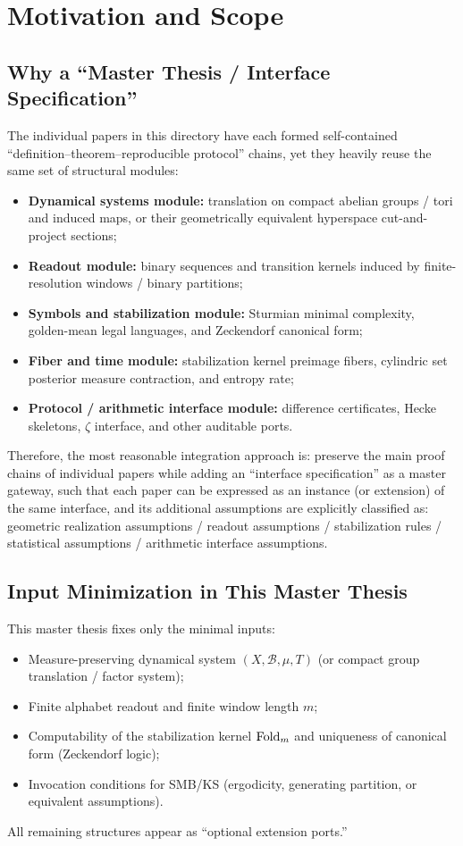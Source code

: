 \section{Motivation and Scope}

\subsection{Why a ``Master Thesis / Interface Specification''}

The individual papers in this directory have each formed self-contained ``definition--theorem--reproducible protocol'' chains, yet they heavily reuse the same set of structural modules:
\begin{itemize}
  \item \textbf{Dynamical systems module:} translation on compact abelian groups / tori and induced maps, or their geometrically equivalent hyperspace cut-and-project sections;
  \item \textbf{Readout module:} binary sequences and transition kernels induced by finite-resolution windows / binary partitions;
  \item \textbf{Symbols and stabilization module:} Sturmian minimal complexity, golden-mean legal languages, and Zeckendorf canonical form;
  \item \textbf{Fiber and time module:} stabilization kernel preimage fibers, cylindric set posterior measure contraction, and entropy rate;
  \item \textbf{Protocol / arithmetic interface module:} difference certificates, Hecke skeletons, $\zeta$ interface, and other auditable ports.
\end{itemize}

Therefore, the most reasonable integration approach is: preserve the main proof chains of individual papers while adding an ``interface specification'' as a master gateway, such that each paper can be expressed as an instance (or extension) of the same interface, and its additional assumptions are explicitly classified as: geometric realization assumptions / readout assumptions / stabilization rules / statistical assumptions / arithmetic interface assumptions.

\subsection{Input Minimization in This Master Thesis}

This master thesis fixes only the minimal inputs:
\begin{itemize}
  \item Measure-preserving dynamical system $(X,\mathcal{B},\mu,T)$ (or compact group translation / factor system);
  \item Finite alphabet readout and finite window length $m$;
  \item Computability of the stabilization kernel $\mathrm{Fold}_m$ and uniqueness of canonical form (Zeckendorf logic);
  \item Invocation conditions for SMB/KS (ergodicity, generating partition, or equivalent assumptions).
\end{itemize}
All remaining structures appear as ``optional extension ports.''

